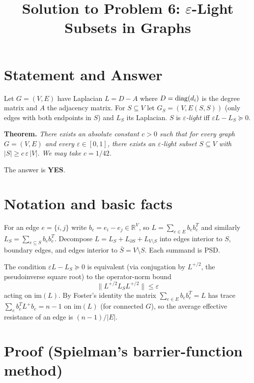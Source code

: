 

\title{Solution to Problem 6: $\varepsilon$-Light Subsets in Graphs}
\date{}


\maketitle

\section*{Statement and Answer}

Let $G=(V,E)$ have Laplacian $L=D-A$ where $D=\operatorname{diag}(d_i)$ is the degree matrix and $A$ the adjacency matrix.  For $S\subseteq V$ let $G_S=(V,E(S,S))$ (only edges with both endpoints in $S$) and $L_S$ its Laplacian.  $S$ is \emph{$\varepsilon$-light} iff $\varepsilon L - L_S\succeq 0$.

\medskip
\noindent\textbf{Theorem.}  \emph{There exists an absolute constant $c>0$ such that for every graph $G=(V,E)$ and every $\varepsilon\in[0,1]$, there exists an $\varepsilon$-light subset $S\subseteq V$ with $|S|\geq c\,\varepsilon\,|V|$.  We may take $c=1/42$.}

\medskip
\noindent The answer is \textbf{YES}.

\section*{Notation and basic facts}

For an edge $e=\{i,j\}$ write $b_e=e_i-e_j\in\mathbb R^V$, so $L=\sum_{e\in E}b_eb_e^T$ and similarly $L_S=\sum_{e\subseteq S}b_eb_e^T$.  Decompose $L=L_S+L_{\partial S}+L_{V\setminus S}$ into edges interior to $S$, boundary edges, and edges interior to $\bar S=V\setminus S$.  Each summand is PSD.

The condition $\varepsilon L - L_S\succeq 0$ is equivalent (via conjugation by $L^{+/2}$, the pseudoinverse square root) to the operator-norm bound
\[
\|L^{+/2} L_S L^{+/2}\| \leq \varepsilon
\]
acting on $\mathrm{im}(L)$.  By Foster's identity the matrix $\sum_{e\in E} b_eb_e^T = L$ has trace $\sum_e b_e^TL^+b_e=n-1$ on $\mathrm{im}(L)$ (for connected $G$), so the average effective resistance of an edge is $(n-1)/|E|$.

\section*{Proof (Spielman's barrier-function method)}

